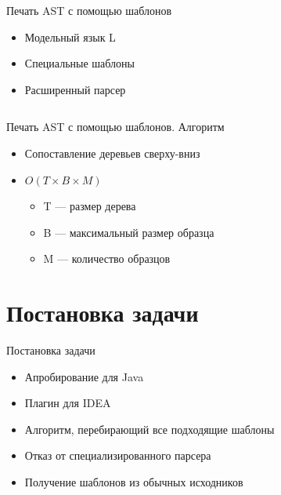 \documentclass[sans]{beamer}
\begin{document}
\begin{frame}{Печать AST с помощью шаблонов}
	\begin{itemize}
		\item Модельный язык L
		\item Специальные шаблоны
		\item Расширенный парсер 
	\end{itemize}
	\begin{block}{}
		\inputminted{pascal}{codes/l_write.t}
	\end{block}
\end{frame}

\begin{frame}{Печать AST с помощью шаблонов. Алгоритм}
	\begin{itemize}
		\item Сопоставление деревьев сверху-вниз
		\item $O(T \times B \times M)$
		\begin{itemize}
			\item T --- размер дерева
			\item B --- максимальный размер образца
			\item M --- количество образцов
		\end{itemize}
	\end{itemize}
\end{frame}

\section{Постановка задачи}

\begin{frame}{Постановка задачи}
	\begin{itemize}
		\item Апробирование для Java
		\item Плагин для IDEA
		\item Алгоритм, перебирающий все подходящие шаблоны
	\end{itemize}
	\pause
	\begin{itemize}
		\item Отказ от специализированного парсера
		\item Получение шаблонов из обычных исходников
	\end{itemize}
\end{frame}
\end{document}
